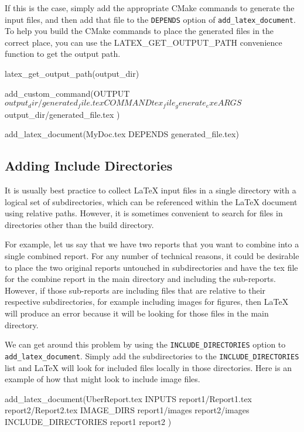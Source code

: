 \documentclass{article}
\newcommand*{\textcmake}[1]{\texttt{#1}}
\newcommand*{\latex}{\LaTeX\xspace}
\newcommand*{\ald}{\textcmake{add\_latex\_document}\xspace}
\begin{document}
  If this is the case, simply add the appropriate CMake commands to generate the input files, and then add that file to the \textcmake{DEPENDS} option of \ald.
  To help you build the CMake commands to place the generated files in the correct place, you can use the LATEX\_GET\_OUTPUT\_PATH convenience function to get the output path.

  \begin{CodeListing}
latex_get_output_path(output_dir)

add_custom_command(OUTPUT ${output_dir}/generated_file.tex
  COMMAND tex_file_generate_exe
  ARGS ${output_dir}/generated_file.tex
  )

add_latex_document(MyDoc.tex DEPENDS generated_file.tex)
  \end{CodeListing}

  \subsection{Adding Include Directories}
  \label{sec:AddingIncludeDirectories}

  It is usually best practice to collect \latex input files in a single directory with a logical set of subdirectories, which can be referenced within the \latex document using relative paths.
  However, it is sometimes convenient to search for files in directories other than the build directory.

  For example, let us say that we have two reports that you want to combine into a single combined report.
  For any number of technical reasons, it could be desirable to place the two original reports untouched in subdirectories and have the tex file for the combine report in the main directory and including the sub-reports.
  However, if those sub-reports are including files that are relative to their respective subdirectories, for example including images for figures, then \latex will produce an error because it will be looking for those files in the main directory.

  We can get around this problem by using the \textcmake{INCLUDE\_DIRECTORIES} option to \ald.
  Simply add the subdirectories to the \textcmake{INCLUDE\_DIRECTORIES} list and \latex will look for included files locally in those directories.
  Here is an example of how that might look to include image files.

  \begin{CodeListing}
add_latex_document(UberReport.tex
  INPUTS report1/Report1.tex report2/Report2.tex
  IMAGE_DIRS report1/images report2/images
  INCLUDE_DIRECTORIES report1 report2
  )
  \end{CodeListing}
\end{document}
